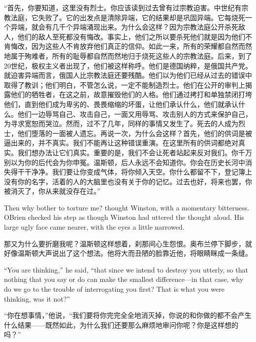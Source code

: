 \begin{paracol}{2}
``首先，你要知道，这里没有烈士。你应该读到过去曾有过宗教迫害。中世纪有宗教法庭，它失败了。它的出发点是清除异端，它的结果却是巩固异端。它每烧死一个异端，就会有几千个异端涌现出来。为什么会这样？因为宗教法庭公开杀死敌人，他们的敌人至死都没有悔改。事实上，他们之所以要杀死他们就是因为他们不肯悔改，因为这些人不肯放弃他们真正的信仰。如此一来，所有的荣耀都自然而然地属于殉难者，所有的耻辱都自然而然地归于烧死这些人的宗教法庭。后来，到了20世纪，极权主义者出现了，他们被这样称呼。他们是德国纳粹，是俄国共产党。就迫害异端而言，俄国人比宗教法庭还要残酷。他们以为他们已经从过去的错误中取得了教训；他们明白，不管怎么说，一定不能制造烈士。他们在公开的审判上揭露他们的牺牲者，在这之前，故意摧毁他们的人格。他们通过拷打和单独禁闭打垮他们，直到他们成为卑劣的、畏畏缩缩的坏蛋，让他们承认什么，他们就承认什么。他们一边辱骂自己、攻击自己，一面又用辱骂、攻击别人的方式来保护自己，为寻求宽恕而哭泣。然而，过不了几年，同样的事情又发生了。死去的人成为烈士，他们堕落的一面被人遗忘。再说一次，为什么会这样？首先，他们的供词是被逼出来的，并不真实。我们不能再让这种错误重演。在这里所有的供词都绝对真实。我们想办法让它们真实。重要的是，我们不会让死者站起来反对我们。你千万别以为你的后代会为你申冤。温斯顿，后人永远不会知道你。你会在历史长河中消失得干干净净。我们要让你变成气体，将你倾入天空。你什么都留不下，登记簿上没有你的名字，活着的人的大脑里也没有关于你的记忆。过去也好，将来也罢，你被消灭了，你从来就没存在过。''

\switchcolumn*

Then why bother to torture me? thought Winston, with a momentary
bitterness. O\textquotesingle Brien checked his step as though Winston
had uttered the thought aloud. His large ugly face came nearer, with the
eyes a little narrowed.

\switchcolumn

那又为什么要折磨我呢？温斯顿这样想着，刹那间心生怨恨。奥布兰停下脚步，就好像温斯顿大声说出了这个想法。他将大而丑陋的脸靠近他，将眼睛眯成一条缝。

\switchcolumn*

``You are thinking,'' he said, ``that since we intend to destroy you
utterly, so that nothing that you say or do can make the smallest
difference---in that case, why do we go to the trouble of interrogating
you first? That is what you were thinking, was it not?''

\switchcolumn

``你在想事情，''他说，``我们要将你完完全全地消灭掉，你说的和你做的都不会产生什么结果——既然如此，为什么我们还要那么麻烦地审问你呢？你是这样想的吗？''


\end{paracol}

